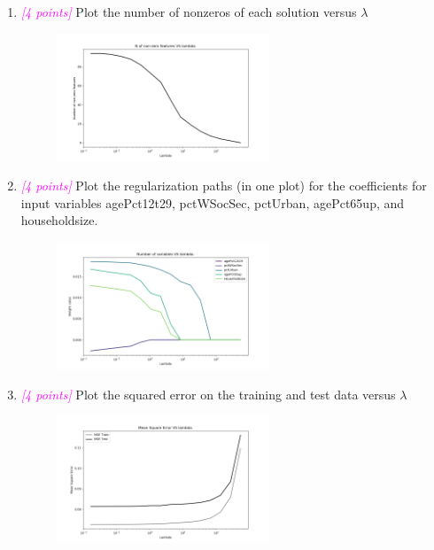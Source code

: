 \documentclass{article}
\newcommand{\1}{\mathbf{1}}
\newcommand{\points}[1]{\small\textcolor{magenta}{\emph{[#1 points]}} \normalsize}
\begin{document}
\begin{enumerate}
    \item \points{4} Plot the number of nonzeros of each solution versus $\lambda$ \\
    \begin{figure}[h!]
        \centering
        \includegraphics[width=0.6\textwidth]{HW2/HW2_plots/A5ZerosVSLambdas.png}
    \end{figure}

    \newpage
    \item \points{4} Plot the regularization paths (in one plot) for the coefficients for input variables agePct12t29, pctWSocSec, pctUrban, agePct65up, and householdsize. \\ 
    
    \begin{figure}[h!]
        \centering
        \includegraphics[width=0.6\textwidth]{HW2/HW2_plots/5RegPaths.png}
    \end{figure}
    
    \item \points{4} Plot the squared error on the training and test data versus $\lambda$ \\
    \begin{figure}[h!]
        \centering
        \includegraphics[width=0.6\textwidth]{HW2/HW2_plots/MSEA5.png}
    \end{figure}
    

\end{enumerate}
\end{document}
